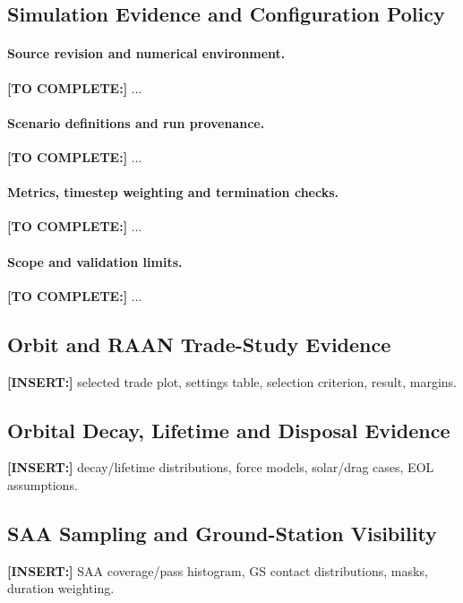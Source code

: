 
\subsection{Simulation Evidence and Configuration Policy}\label{sec:simulation-policy}
\paragraph{Source revision and numerical environment.} \textbf{[TO COMPLETE:]} ...
\paragraph{Scenario definitions and run provenance.} \textbf{[TO COMPLETE:]} ...
\paragraph{Metrics, timestep weighting and termination checks.} \textbf{[TO COMPLETE:]} ...
\paragraph{Scope and validation limits.} \textbf{[TO COMPLETE:]} ...

\subsection{Orbit and RAAN Trade-Study Evidence}\label{sec:sim-orbit-raan}
\textbf{[INSERT:]} selected trade plot, settings table, selection criterion, result, margins.

\subsection{Orbital Decay, Lifetime and Disposal Evidence}\label{sec:sim-orbit-lifetime}
\textbf{[INSERT:]} decay/lifetime distributions, force models, solar/drag cases, EOL assumptions.

\subsection{SAA Sampling and Ground-Station Visibility}\label{sec:sim-coverage}
\textbf{[INSERT:]} SAA coverage/pass histogram, GS contact distributions, masks, duration weighting.

